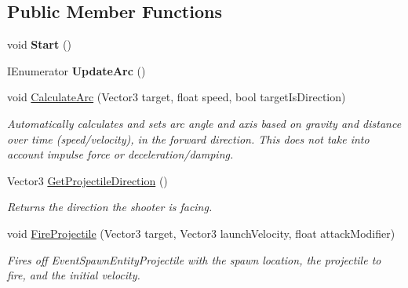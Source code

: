 \subsection*{Public Member Functions}
\begin{DoxyCompactItemize}
\item 
\hypertarget{class_skyrates_1_1_mono_1_1_shooter_a41f3c5e8c03befce02f57ad9b11ec914}{void {\bfseries Start} ()}\label{class_skyrates_1_1_mono_1_1_shooter_a41f3c5e8c03befce02f57ad9b11ec914}

\item 
\hypertarget{class_skyrates_1_1_mono_1_1_shooter_a36d20e8cd473fe5e9c49342d1f4a33e5}{I\-Enumerator {\bfseries Update\-Arc} ()}\label{class_skyrates_1_1_mono_1_1_shooter_a36d20e8cd473fe5e9c49342d1f4a33e5}

\item 
void \hyperlink{class_skyrates_1_1_mono_1_1_shooter_a327d02dace8d3388b098c83c011bf41d}{Calculate\-Arc} (Vector3 target, float speed, bool target\-Is\-Direction)
\begin{DoxyCompactList}\small\item\em Automatically calculates and sets arc angle and axis based on gravity and distance over time (speed/velocity), in the forward direction. This does not take into account impulse force or deceleration/damping. \end{DoxyCompactList}\item 
Vector3 \hyperlink{class_skyrates_1_1_mono_1_1_shooter_a170280e49b56961d0211a4c611f7f54b}{Get\-Projectile\-Direction} ()
\begin{DoxyCompactList}\small\item\em Returns the direction the shooter is facing. \end{DoxyCompactList}\item 
void \hyperlink{class_skyrates_1_1_mono_1_1_shooter_ad9d7d5122f1b16cfd43c3db5474fe282}{Fire\-Projectile} (Vector3 target, Vector3 launch\-Velocity, float attack\-Modifier)
\begin{DoxyCompactList}\small\item\em Fires off Event\-Spawn\-Entity\-Projectile with the spawn location, the projectile to fire, and the initial velocity. \end{DoxyCompactList}\end{DoxyCompactItemize}

